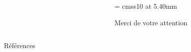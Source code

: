 \documentclass[english]{beamer}
\begin{document}
\begin{frame}

  \begin{columns}
    \begin{column}{0.70\textwidth}
      \begin{center}
      \begin{figure}[ht]
    \centering
        \def\svgwidth{\columnwidth}
    
\end{figure}

      \end{center}
    \end{column}
    \begin{column}{0.30\textwidth}
      \begin{center}

        \font\endfont = cmss10 at 5.40mm
\color[rgb]{0.00,0.00,1.00}       \endfont 
        \baselineskip 7.0mm

        Merci de votre attention

      \end{center}    

    \end{column}
  \end{columns}

\end{frame}
\begin{frame}{Références}
\tiny


    

\end{frame}
\end{document}
